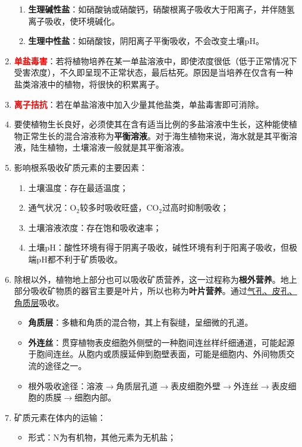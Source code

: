 \begin{enumerate}
\begin{enumerate}
        \item \textbf{生理碱性盐}：如硝酸钠或硝酸钙，硝酸根离子吸收大于阳离子，并伴随氢离子吸收，使环境碱化。
        \item \textbf{生理中性盐}：如硝酸铵，阴阳离子平衡吸收，不会改变土壤pH。
    \end{enumerate}
    \item \textcolor{red}{\textbf{单盐毒害}}：若将植物培养在某一单盐溶液中，即使浓度很低（低于正常情况下受害浓度），不久即呈现不正常状态，最后枯死。原因是当培养在仅含有一种盐类溶液中的植物，将很快的积累离子。
    \item \textcolor{red}{\textbf{离子拮抗}}：若在单盐溶液中加入少量其他盐类，单盐毒害即可消除。
    \item 要使植物生长良好，必须使其在含有适当比例的多盐溶液中生长，这种能使植物正常生长的混合溶液称为\textbf{平衡溶液}。对于海生植物来说，海水就是其平衡溶液，陆生植物，土壤溶液一般就是其平衡溶液。
    \item 影响根系吸收矿质元素的主要因素：
    \begin{enumerate}
        \item 土壤温度：存在最适温度；
        \item 通气状况：O$_2$较多时吸收旺盛，CO$_2$过高时抑制吸收；
        \item 土壤溶液浓度：存在饱和吸收速率；
        \item 土壤pH：酸性环境有得于阴离子吸收，碱性环境有利于阳离子吸收，但极端pH都不利于矿质吸收。
    \end{enumerate}
    \item 除根以外，植物地上部分也可以吸收矿质营养，这一过程称为\textbf{根外营养}。地上部分吸收矿物质的器官主要是叶片，所以也称为\textbf{叶片营养}。通过\uline{气孔、皮孔、角质层}吸收。
    \begin{itemize}
        \item \textbf{角质层}：多糖和角质的混合物，其上有裂缝，呈细微的孔道。
        \item \textbf{外连丝}：贯穿植物表皮细胞外侧壁的一种胞间连丝样纤细通道，可能起源于胞间连丝。从胞内或质膜延伸到胞壁表面，可能是细胞内、外间物质交流的途径之一。
        \item 根外吸收途径：溶液$\to$角质层孔道$\to$表皮细胞外壁$\to$外连丝$\to$表皮细胞的质膜$\to$细胞内部。
    \end{itemize}
    \item 矿质元素在体内的运输：
    \begin{itemize}
        \item 形式：N为有机物，其他元素为无机盐；

\end{itemize}
\end{enumerate}
